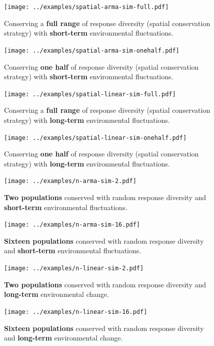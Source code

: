 \clearpage

\begin{figure}[htbp]
\centering
\texttt{[image: ../examples/spatial-arma-sim-full.pdf]}
\caption{Conserving a \textbf{full range} of response diversity (spatial conservation strategy) with \textbf{short-term} environmental fluctuations.}
\label{f:eg-sp-arma}
\end{figure}

\clearpage

\begin{figure}[htbp]
\centering
\texttt{[image: ../examples/spatial-arma-sim-onehalf.pdf]}
\caption{Conserving \textbf{one half} of response diversity (spatial conservation strategy) with \textbf{short-term} environmental fluctuations.}
\label{f:eg-sp-arma}
\end{figure}

\clearpage

\begin{figure}[htbp]
\centering
\texttt{[image: ../examples/spatial-linear-sim-full.pdf]}
\caption{Conserving a \textbf{full range} of response diversity (spatial conservation strategy) with \textbf{long-term} environmental fluctuations.}
\label{f:eg-sp-linear}
\end{figure}

\clearpage

\begin{figure}[htbp]
\centering
\texttt{[image: ../examples/spatial-linear-sim-onehalf.pdf]}
\caption{Conserving \textbf{one half} of response diversity (spatial conservation strategy) with \textbf{long-term} environmental fluctuations.}
\label{f:eg-sp-linear}
\end{figure}

\clearpage

\begin{figure}[htbp]
\centering
\texttt{[image: ../examples/n-arma-sim-2.pdf]}
\caption{\textbf{Two populations} conserved with random response diversity and \textbf{short-term} environmental fluctuations.}
\label{f:eg-n-arma}
\end{figure}

\clearpage

\begin{figure}[htbp]
\centering
\texttt{[image: ../examples/n-arma-sim-16.pdf]}
\caption{\textbf{Sixteen populations} conserved with random response diversity and \textbf{short-term} environmental fluctuations.}
\label{f:eg-n-arma}
\end{figure}

\clearpage

\begin{figure}[htbp]
\centering
\texttt{[image: ../examples/n-linear-sim-2.pdf]}
\caption{\textbf{Two populations} conserved with random response diversity and \textbf{long-term} environmental change.}
\label{f:eg-n-linear}
\end{figure}

\clearpage

\begin{figure}[htbp]
\centering
\texttt{[image: ../examples/n-linear-sim-16.pdf]}
\caption{\textbf{Sixteen populations} conserved with random response diversity and \textbf{long-term} environmental change.}
\label{f:eg-n-linear}
\end{figure}
